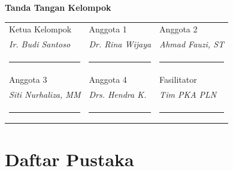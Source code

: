 \documentclass[12pt,a4paper]{report}
\begin{document}
\begin{center}
\begin{tcolorbox}[colback=plngreen!5, colframe=plngreen!70!black, width=0.88\textwidth, sharp corners, boxrule=1pt]
\centering
\textbf{Tanda Tangan Kelompok}\\[0.4cm]
\begin{tabularx}{0.9\textwidth}{@{} X X X @{}}
\centering Ketua Kelompok & \centering Anggota 1 & \centering Anggota 2 \tabularnewline[0.8cm]
\centering\textit{Ir. Budi Santoso} & \centering\textit{Dr. Rina Wijaya} & \centering\textit{Ahmad Fauzi, ST} \tabularnewline[0.1cm]
\centering\rule{3cm}{0.3pt} & \centering\rule{3cm}{0.3pt} & \centering\rule{3cm}{0.3pt} \tabularnewline[0.3cm]
\centering Anggota 3 & \centering Anggota 4 & \centering Fasilitator \tabularnewline[0.8cm]
\centering\textit{Siti Nurhaliza, MM} & \centering\textit{Drs. Hendra K.} & \centering\textit{Tim PKA PLN} \tabularnewline[0.1cm]
\centering\rule{3cm}{0.3pt} & \centering\rule{3cm}{0.3pt} & \centering\rule{3cm}{0.3pt} \tabularnewline
\end{tabularx}
\end{tcolorbox}
\end{center}

\newpage
\section*{Daftar Pustaka}
\end{document}
